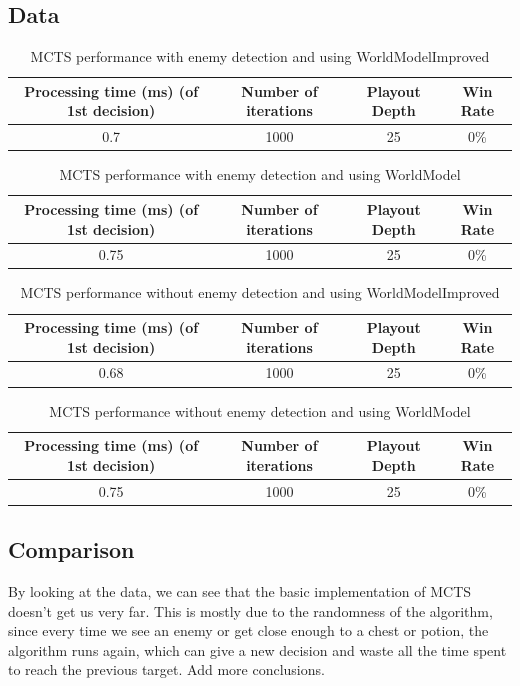 \documentclass{article}
\begin{document}
  \subsection{Data}
  \begin{table}[h!]
    \centering
    \caption{MCTS performance with enemy detection and using WorldModelImproved}
    \label{tab:tableMCTS1}
    \begin{tabular}{c|c|c|c}
      \textbf{Processing time (ms) (of 1st decision)} & \textbf{Number of iterations} & \textbf{Playout Depth} & \textbf{Win Rate}\\
      \hline
      0.7 & 1000 & 25 & 0\%
    \end{tabular}
  \end{table}
  \begin{table}[h!]
    \centering
    \caption{MCTS performance with enemy detection and using WorldModel}
    \label{tab:tableMCTS2}
    \begin{tabular}{c|c|c|c}
      \textbf{Processing time (ms) (of 1st decision)} & \textbf{Number of iterations} & \textbf{Playout Depth} & \textbf{Win Rate}\\
      \hline
      0.75 & 1000 & 25 & 0\%
    \end{tabular}
  \end{table}
  \begin{table}[h!]
    \centering
    \caption{MCTS performance without enemy detection and using WorldModelImproved}
    \label{tab:tableMCTS3}
    \begin{tabular}{c|c|c|c}
      \textbf{Processing time (ms) (of 1st decision)} & \textbf{Number of iterations} & \textbf{Playout Depth} & \textbf{Win Rate}\\
      \hline
      0.68 & 1000 & 25 & 0\%
    \end{tabular}
  \end{table}
  \begin{table}[h!]
    \centering
    \caption{MCTS performance without enemy detection and using WorldModel}
    \label{tab:tableMCTS4}
    \begin{tabular}{c|c|c|c}
      \textbf{Processing time (ms) (of 1st decision)} & \textbf{Number of iterations} & \textbf{Playout Depth} & \textbf{Win Rate}\\
      \hline
      0.75 & 1000 & 25 & 0\%
    \end{tabular}
  \end{table}

  \subsection{Comparison}
  By looking at the data, we can see that the basic implementation of MCTS doesn't get us very far. This is mostly due to the randomness of the algorithm, 
  since every time we see an enemy or get close enough to a chest or potion, the algorithm runs again, which can give a new decision and waste all 
  the time spent to reach the previous target.
  Add more conclusions.\\
\end{document}
